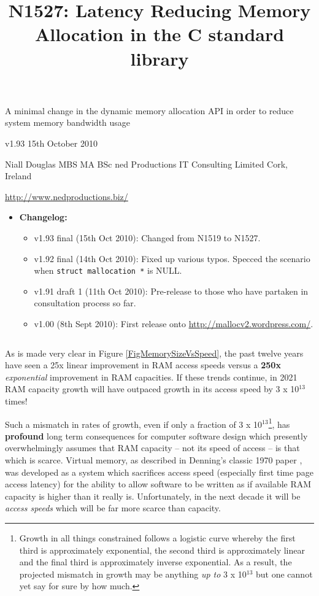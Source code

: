 \documentclass[wd]{isov2}
\newcommand{\superscript}[1]{\ensuremath{^{\textrm{#1}}}}
\begin{document}
\title{N1527: Latency Reducing Memory Allocation in the C standard library}{\linebreak \large{A minimal change in the dynamic memory allocation API in order to reduce system memory bandwidth usage}}{}

v1.93 15th October 2010

Niall Douglas MBS MA BSc \hfill ned Productions IT Consulting Limited \linebreak
Cork, Ireland \hfill {\url{http://www.nedproductions.biz/}

\small{\begin{itemize}
\item \textbf{Changelog:}
\tiny{\begin{itemize}
\item v1.93 final (15th Oct 2010): Changed from N1519 to N1527.
\item v1.92 final (14th Oct 2010): Fixed up various typos. Specced the scenario when \texttt{struct mallocation *} is NULL.
\item v1.91 draft 1 (11th Oct 2010): Pre-release to those who have partaken in consultation process so far.
\item v1.00 (8th Sept 2010): First release onto \url{http://mallocv2.wordpress.com/}.
\end{itemize}}
\end{itemize}}

\begin{verbatim}
\end{verbatim}

\begin{foreword}
As is made very clear in Figure \ref{FigMemorySizeVsSpeed}, the past twelve years have seen a 25x linear improvement in RAM access speeds versus a \textbf{250x} \emph{exponential} improvement in RAM capacities. If these trends continue, in 2021 RAM capacity growth will have outpaced growth in its access speed by 3 x 10\superscript{13} times!

Such a mismatch in rates of growth, even if only a fraction of 3 x 10\superscript{13}\footnote{Growth in all things constrained follows a logistic curve whereby the first third is approximately exponential, the second third is approximately linear and the final third is approximately inverse exponential. As a result, the projected mismatch in growth may be anything \emph{up to} 3 x 10\superscript{13} but one cannot yet say for sure by how much.}, has \textbf{profound} long term consequences for computer software design which presently overwhelmingly assumes that RAM capacity -- not its speed of access -- is that which is scarce. Virtual memory, as described in Denning's classic 1970 paper , was developed as a system which sacrifices access speed (especially first time page access latency) for the ability to allow software to be written as if available RAM capacity is higher than it really is. Unfortunately, in the next decade it will be \emph{access speeds} which will be far more scarce than capacity.


\end{foreword}}
\end{document}
